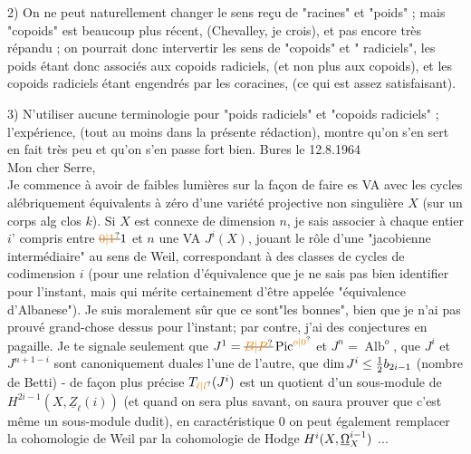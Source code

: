 2) On ne peut naturellement changer le sens reçu de "racines" et "poids" ; mais "copoids" est beaucoup plus récent, (Chevalley, je crois), et pas encore très répandu ; on pourrait donc intervertir les sens de "copoids" et " radiciels", les poids étant donc associés aux copoids radiciels, (et non plus aux copoids), et les copoids radiciels étant engendrés par les coracines, (ce qui est assez satisfaisant).

3) N'utiliser aucune terminologie pour "poids radiciels" et "copoids radiciels" ; l'expérience, (tout au moins dans la présente rédaction), montre qu'on s'en sert en fait très peu et qu'on s'en passe fort bien.
\hfill Bures le 12.8.1964\\
Mon cher Serre,\\

Je commence à avoir de faibles lumières sur la façon de faire es VA avec les cycles alébriquement équivalents à zéro d'une variété projective non singulière $X$ (sur un corps alg clos $k$). Si $X$ est connexe de dimension $n$, je sais associer à chaque entier $i$' compris entre $\deleted{\unsure{0|1}}1$ et $n$ une VA $J^i(X)$, jouant le rôle d'une "jacobienne intermédiaire" au sens de Weil, correspondant à des classes de cycles de codimension $i$ (pour une relation d'équivalence que je ne sais pas bien identifier pour l'instant, mais qui mérite certainement d'être appelée "équivalence d'Albanese"). Je suis moralement sûr que ce sont"les bonnes", bien que je n'ai pas prouvé grand-chose dessus pour l'instant; par contre, j'ai des conjectures en pagaille. Je te signale seulement que $J^1=\deleted{\unsure{B|P}}\operatorname{Pic}^{\unsure{o|0}}$ et $J^n=\operatorname{Alb}^{o}$, que $J^i$ et $J^{n+1-i}$ sont canoniquement duales l'une de l'autre, que $\dim J^i\leq\frac{1}{2}b_{2i-1}$ (nombre de Betti) - de façon plus précise $T_{\unsure{\ell|l}}(J^i)$ est un quotient d'un sous-module de $H^{2i-1}(X,\underline{Z}_{\ell}(i))$ (et quand on sera plus savant, on saura prouver que c'est même un sous-module dudit), en caractéristique $0$ on peut également remplacer la cohomologie de Weil par la cohomologie de Hodge $H^i(X,\underline{\Omega}_X^{i-1})$ ...


